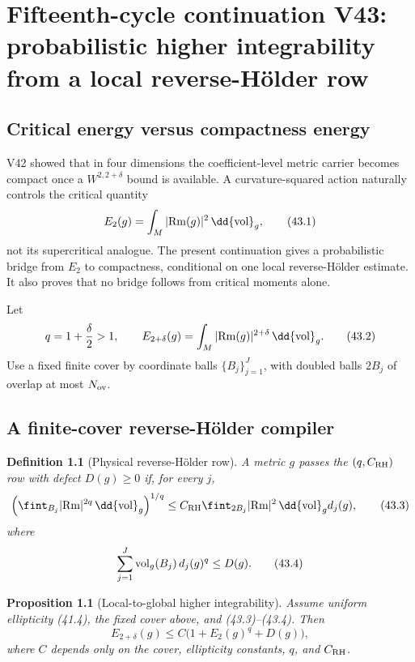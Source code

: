\documentclass[11pt]{article}
\newtheorem{proposition}[theorem]{Proposition}
\newtheorem{definition}[theorem]{Definition}
\theoremstyle{remark}
\begin{document}
\chapter{Fifteenth-cycle continuation V43: probabilistic higher integrability from a local reverse-Hölder row}
\label{sec:v15v43}

\section{Critical energy versus compactness energy}

V42 showed that in four dimensions the coefficient-level metric
carrier becomes compact once a \(W^{2,2+\delta}\) bound is
available.  A curvature-squared action naturally controls the
critical quantity
\[
 E_2(g)=\int_M|{\rm Rm}(g)|^2\,\dd{\rm vol}_g,           \tag{43.1}
\]
not its supercritical analogue.  The present continuation gives a
probabilistic bridge from \(E_2\) to compactness, conditional on one
local reverse-Hölder estimate.  It also proves that no bridge follows
from critical moments alone.

Let
\[
 q=1+\frac{\delta}{2}>1,\qquad
 E_{2+\delta}(g)=
 \int_M|{\rm Rm}(g)|^{2+\delta}\,\dd{\rm vol}_g.         \tag{43.2}
\]
Use a fixed finite cover by coordinate balls
\(\{B_j\}_{j=1}^J\), with doubled balls \(2B_j\) of overlap at most
\(N_{\rm ov}\).

\section{A finite-cover reverse-Hölder compiler}

\begin{definition}[Physical reverse-Hölder row]
\label{def:v15v43-rh}
A metric \(g\) passes the \((q,C_{\rm RH})\) row with defect
\(D(g)\geq0\) if, for every \(j\),
\[
 \left(\fint_{B_j}|{\rm Rm}|^{2q}\,\dd{\rm vol}_g\right)^{1/q}
 \leq
 C_{\rm RH}\fint_{2B_j}|{\rm Rm}|^2\,\dd{\rm vol}_g
 d_j(g),                                                \tag{43.3}
\]
where
\[
 \sum_{j=1}^J {\rm vol}_g(B_j)\,d_j(g)^q\leq D(g).       \tag{43.4}
\]
\end{definition}

\begin{proposition}[Local-to-global higher integrability]
\label{prop:v15v43-local-global}
Assume uniform ellipticity (41.4), the fixed cover above, and
(43.3)--(43.4).  Then
\[
 \boxed{
 E_{2+\delta}(g)
 \leq C\bigl(1+E_2(g)^q+D(g)\bigr),}                    \tag{43.5}
\]
where \(C\) depends only on the cover, ellipticity constants,
\(q\), and \(C_{\rm RH}\).
\end{proposition}
\end{document}
